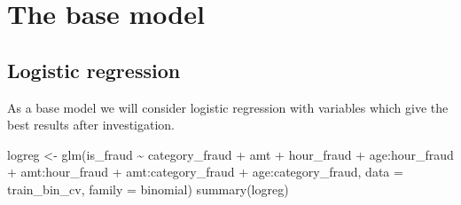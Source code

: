 \documentclass[
]{report}
\newenvironment{Shaded}{\begin{snugshade}}{\end{snugshade}}
\newcommand{\AttributeTok}[1]{\textcolor[rgb]{0.77,0.63,0.00}{#1}}
\newcommand{\DecValTok}[1]{\textcolor[rgb]{0.00,0.00,0.81}{#1}}
\newcommand{\FloatTok}[1]{\textcolor[rgb]{0.00,0.00,0.81}{#1}}
\newcommand{\FunctionTok}[1]{\textcolor[rgb]{0.00,0.00,0.00}{#1}}
\newcommand{\NormalTok}[1]{#1}
\newcommand{\OtherTok}[1]{\textcolor[rgb]{0.56,0.35,0.01}{#1}}
\newcommand{\SpecialCharTok}[1]{\textcolor[rgb]{0.00,0.00,0.00}{#1}}
\begin{document}
\begin{Shaded}
\end{Shaded}

\hypertarget{the-base-model}{%
\section{The base model}\label{the-base-model}}

\hypertarget{logistic-regression}{%
\subsection{Logistic regression}\label{logistic-regression}}

As a base model we will consider logistic regression with variables
which give the best results after investigation.

\begin{Shaded}
\begin{Highlighting}[]
\NormalTok{logreg }\OtherTok{\textless{}{-}} \FunctionTok{glm}\NormalTok{(is\_fraud }\SpecialCharTok{\textasciitilde{}} 
\NormalTok{                category\_fraud }\SpecialCharTok{+}\NormalTok{ amt }\SpecialCharTok{+}\NormalTok{ hour\_fraud }\SpecialCharTok{+}\NormalTok{ age}\SpecialCharTok{:}\NormalTok{hour\_fraud }\SpecialCharTok{+}\NormalTok{ amt}\SpecialCharTok{:}\NormalTok{hour\_fraud }\SpecialCharTok{+} 
\NormalTok{                amt}\SpecialCharTok{:}\NormalTok{category\_fraud }\SpecialCharTok{+}\NormalTok{ age}\SpecialCharTok{:}\NormalTok{category\_fraud,}
              \AttributeTok{data =}\NormalTok{ train\_bin\_cv, }\AttributeTok{family =}\NormalTok{ binomial)}
\FunctionTok{summary}\NormalTok{(logreg)}
\end{Highlighting}
\end{Shaded}
\end{document}
